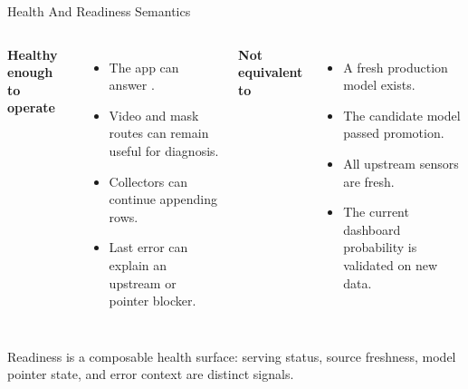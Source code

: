 \documentclass[aspectratio=169]{beamer}
\begin{document}
\begin{frame}[shrink=4]{Health And Readiness Semantics}
\begin{columns}[T,onlytextwidth]
\textbf{Healthy enough to operate}
\begin{itemize}
  \item The app can answer .
  \item Video and mask routes can remain useful for diagnosis.
  \item Collectors can continue appending rows.
  \item Last error can explain an upstream or pointer blocker.
\end{itemize}

\textbf{Not equivalent to}
\begin{itemize}
  \item A fresh production model exists.
  \item The candidate model passed promotion.
  \item All upstream sensors are fresh.
  \item The current dashboard probability is validated on new data.
\end{itemize}
\end{columns}
\tightsep
\begin{center}
\parbox{0.82\textwidth}{\centering\small Readiness is a composable health surface: serving status, source freshness, model pointer state, and error context are distinct signals.}
\end{center}
\end{frame}
\end{document}
